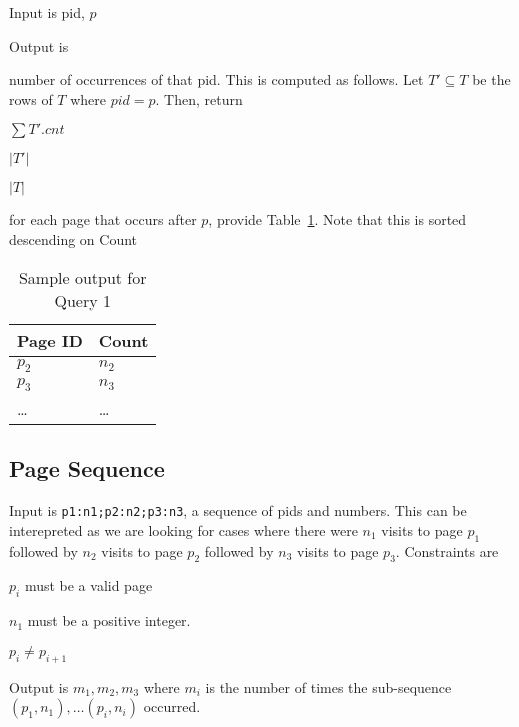 \bi
\item Input is pid, \(p\)
\item Output is 
\be
\item number of occurrences of that pid. This is computed as follows.
Let \(T' \subseteq T\) be the rows of \(T\) where \(pid=p\). Then, return 
\be
\item \(\sum T'.cnt\)
\item \(|T'|\)
\item \(|T|\)
\ee
\item for each page that occurs after \(p\), provide
Table~\ref{Table_1}. Note that this is sorted descending on Count
\ee
\ei

\begin{table}[ht]
\centering
\begin{tabular}{|l|l|} \hline \hline 
{\bf Page ID} & {\bf Count} \\ \hline \hline 
\(p_2\) & \(n_2\) \\ \hline 
\(p_3\) & \(n_3\) \\ \hline 
\ldots & \ldots \\ \hline
\hline
\end{tabular}
\caption{Sample output for Query 1}
\label{Table_1}
\end{table}


\subsection{Page Sequence}
\label{Page_Sequence}

\bi
\item Input is \verb+p1:n1;p2:n2;p3:n3+, a sequence of pids and numbers.
This can be interepreted as we are looking for cases where
there were \(n_1\) visits to page \(p_1\) followed by 
\(n_2\) visits to page \(p_2\) followed by 
\(n_3\) visits to page \(p_3\).
Constraints  are
\be
\item \(p_i\) must be a valid page 
\item \(n_1\) must be a positive integer. 
\item \(p_i \neq p_{i+1}\)
\ee
\item Output is \(m_1, m_2, m_3\) where \(m_i\) is the number of times
the sub-sequence \((p_1, n_1), \ldots (p_i, n_i)\) occurred.
\ei
